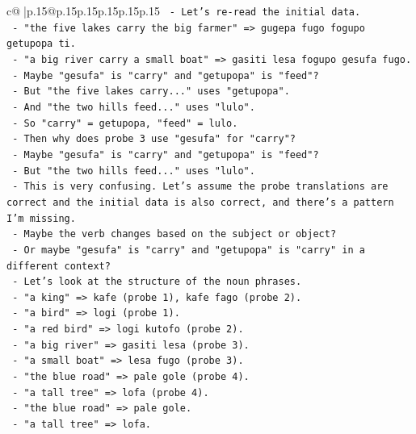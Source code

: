 \documentclass{article}
\begin{document}
{\begin{supertabular}{c@{$\;$}|p{.15\linewidth}@{}p{.15\linewidth}p{.15\linewidth}p{.15\linewidth}p{.15\linewidth}p{.15\linewidth}}
{{{\texttt{         {-} Let's re{-}read the initial data.} \\
\texttt{         {-} "the five lakes carry the big farmer" => gugepa fugo fogupo getupopa ti.} \\
\texttt{         {-} "a big river carry a small boat" => gasiti lesa fogupo gesufa fugo.} \\
\texttt{         {-} Maybe "gesufa" is "carry" and "getupopa" is "feed"?} \\
\texttt{         {-} But "the five lakes carry..." uses "getupopa".} \\
\texttt{         {-} And "the two hills feed..." uses "lulo".} \\
\texttt{         {-} So "carry" = getupopa, "feed" = lulo.} \\
\texttt{         {-} Then why does probe 3 use "gesufa" for "carry"?} \\
\texttt{         {-} Maybe "gesufa" is "carry" and "getupopa" is "feed"?} \\
\texttt{         {-} But "the two hills feed..." uses "lulo".} \\
\texttt{         {-} This is very confusing. Let's assume the probe translations are correct and the initial data is also correct, and there's a pattern I'm missing.} \\
\texttt{         {-} Maybe the verb changes based on the subject or object?} \\
\texttt{         {-} Or maybe "gesufa" is "carry" and "getupopa" is "carry" in a different context?} \\
\texttt{         {-} Let's look at the structure of the noun phrases.} \\
\texttt{         {-} "a king" => kafe (probe 1), kafe fago (probe 2).} \\
\texttt{         {-} "a bird" => logi (probe 1).} \\
\texttt{         {-} "a red bird" => logi kutofo (probe 2).} \\
\texttt{         {-} "a big river" => gasiti lesa (probe 3).} \\
\texttt{         {-} "a small boat" => lesa fugo (probe 3).} \\
\texttt{         {-} "the blue road" => pale gole (probe 4).} \\
\texttt{         {-} "a tall tree" => lofa (probe 4).} \\
\texttt{         {-} "the blue road" => pale gole.} \\
\texttt{         {-} "a tall tree" => lofa.} \\
}}}
\end{supertabular}}
\end{document}
